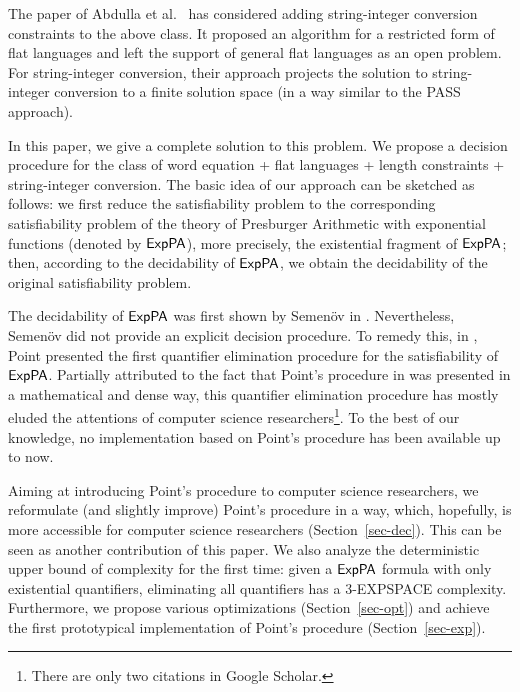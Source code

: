 The paper of Abdulla et al.~\cite{Parosh:20:PLDI} has considered adding string-integer conversion constraints to the above class.
It proposed an algorithm for a restricted form of flat languages and left the support of general flat languages as an open problem.
For string-integer conversion, their approach projects the solution to string-integer conversion to
a finite solution space (in a way similar to the PASS~\cite{goudong2013pass} approach).

In this paper, we give a complete solution to this problem.
We propose a decision procedure for the class of word equation + flat languages + length constraints + string-integer conversion.
The basic idea of our approach can be sketched as follows: we first reduce the satisfiability problem to the corresponding satisfiability problem of the theory of Presburger Arithmetic with exponential functions (denoted by ${\sf ExpPA}$), more precisely, the existential fragment of ${\sf ExpPA}$; then, according to the decidability of ${\sf ExpPA}$, we obtain the decidability of the original satisfiability problem.  

The decidability of ${\sf ExpPA}$ was first shown by Semen\"{o}v in \cite{Semenov84}. Nevertheless, Semen\"{o}v did not provide an explicit decision procedure. To remedy this, in \cite{Point86}, Point presented the first quantifier elimination procedure for the satisfiability of ${\sf ExpPA}$. Partially attributed to the fact that Point's procedure in \cite{Point86} was presented  in a mathematical and dense way, this quantifier elimination procedure has mostly eluded the attentions of computer science researchers\footnote{There are only two citations in Google Scholar.}.  To the best of our knowledge, no implementation based on Point's procedure has been available up to now. 

Aiming at introducing Point's procedure to computer science researchers, we reformulate (and slightly improve) Point's procedure in a way, which, hopefully, is more accessible for computer science researchers (Section~\ref{sec-dec}). This can be seen as another contribution of this paper.
We also analyze the deterministic upper bound of complexity for the first time: given a ${\sf ExpPA}$ formula with only existential quantifiers, eliminating all quantifiers has a 3-EXPSPACE complexity. Furthermore, we propose various optimizations (Section~\ref{sec-opt}) and achieve the first prototypical implementation of Point's procedure (Section~\ref{sec-exp}). 

